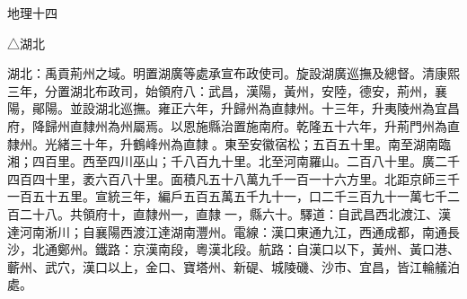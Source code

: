 
\begin{pinyinscope}
地理十四

△湖北

湖北：禹貢荊州之域。明置湖廣等處承宣布政使司。旋設湖廣巡撫及總督。清康熙三年，分置湖北布政司，始領府八：武昌，漢陽，黃州，安陸，德安，荊州，襄陽，鄖陽。並設湖北巡撫。雍正六年，升歸州為直隸州。十三年，升夷陵州為宜昌府，降歸州直隸州為州屬焉。以恩施縣治置施南府。乾隆五十六年，升荊門州為直隸州。光緒三十年，升鶴峰州為直隸。東至安徽宿松；五百五十里。南至湖南臨湘；四百里。西至四川巫山；千八百九十里。北至河南羅山。二百八十里。廣二千四百四十里，袤六百八十里。面積凡五十八萬九千一百一十六方里。北距京師三千一百五十五里。宣統三年，編戶五百五萬五千九十一，口二千三百九十一萬七千二百二十八。共領府十，直隸州一，直隸一，縣六十。驛道：自武昌西北渡江、漢達河南淅川；自襄陽西渡江達湖南灃州。電線：漢口東通九江，西通成都，南通長沙，北通鄭州。鐵路：京漢南段，粵漢北段。航路：自漢口以下，黃州、黃口港、蘄州、武穴，漢口以上，金口、寶塔州、新碮、城陵磯、沙巿、宜昌，皆江輪艤泊處。


\end{pinyinscope}
